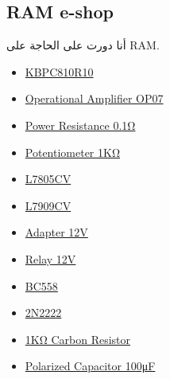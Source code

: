 \documentclass{article}
\begin{document}
\subsection{\textenglish{RAM e-shop}}
أنا دورت على الحاجة على \textenglish{RAM}.
\begin{itemize}
    \item 
    \hyperref{https://ram-e-shop.com/product/bridge-35aw-kbpc3510w/}{}{}{\textenglish{KBPC810R10}}
    \item 
    \hyperref{https://ram-e-shop.com/product/op07/}{}{}{\textenglish{Operational Amplifier OP07}}
    \item 
    \hyperref{https://ram-e-shop.com/product/10w-0-10ohm/}{}{}{\textenglish{Power Resistance 0.1Ω}}
    \item 
    \hyperref{https://ram-e-shop.com/product/pot-th-1k/}{}{}{\textenglish{Potentiometer 1KΩ}}
    \item
    \hyperref{https://ram-e-shop.com/product/7805-china/}{}{}{\textenglish{L7805CV}}
    \item  
    \hyperref{https://ram-e-shop.com/product/7909/}{}{}{\textenglish{L7909CV}}
    \item 
    \hyperref{https://ram-e-shop.com/product/adaptor-fixed-12v-1a/}{}{}{\textenglish{Adapter 12V}}
    \item 
    \hyperref{https://ram-e-shop.com/product/re1/}{}{}{\textenglish{Relay 12V}}
    \item 
    \hyperref{https://ram-e-shop.com/product/bc558/}{}{}{\textenglish{BC558}}
    \item 
    \hyperref{https://ram-e-shop.com/product/2n2222/}{}{}{\textenglish{2N2222}}
    \item 
    \hyperref{https://ram-e-shop.com/product/fixed-resistances-63/}{}{}{\textenglish{1KΩ Carbon Resistor}}
    \item 
    \hyperref{https://ram-e-shop.com/product/c-100u10v/}{}{}{\textenglish{Polarized Capacitor 100μF}}
    
    
    
\end{itemize}


\begin{center}
    \Large \aracricfont 
\end{center} 

\end{document}
